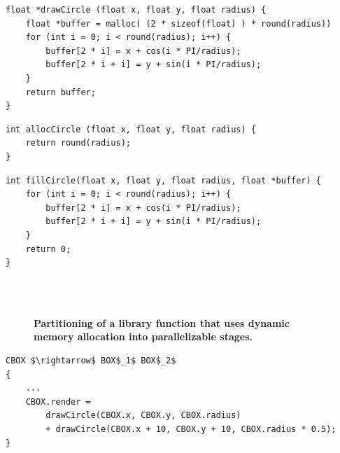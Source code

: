 \newsavebox{\stagedAllocFull}
\begin{lrbox}{\stagedAllocFull}%
\begin{lstlisting}[mathescape]
float *drawCircle (float x, float y, float radius) {
	float *buffer = malloc( (2 * sizeof(float) ) * round(radius))
	for (int i = 0; i < round(radius); i++) {
		buffer[2 * i] = x + cos(i * PI/radius);
		buffer[2 * i + i] = y + sin(i * PI/radius);
	}
	return buffer;
}
\end{lstlisting}
\end{lrbox}

\newsavebox{\stagedAllocAlloc}
\begin{lrbox}{\stagedAllocAlloc}%
\begin{lstlisting}[mathescape]
int allocCircle (float x, float y, float radius) {
	return round(radius);
}
\end{lstlisting}
\end{lrbox}


\newsavebox{\stagedAllocRender}
\begin{lrbox}{\stagedAllocRender}%
\begin{lstlisting}[mathescape]
int fillCircle(float x, float y, float radius, float *buffer) {
	for (int i = 0; i < round(radius); i++) {
		buffer[2 * i] = x + cos(i * PI/radius);
		buffer[2 * i + i] = y + sin(i * PI/radius);
	}	
	return 0;
}
\end{lstlisting}
\end{lrbox}


\begin{figure}
  \\
 \\
\caption{\textbf{Partitioning of a library function that uses dynamic memory allocation into parallelizable stages.}}
\label{fig:stagedalloc}
\end{figure}


\newsavebox{\twocirclesOrig}
\begin{lrbox}{\twocirclesOrig}%
\begin{lstlisting}[mathescape]
CBOX $\rightarrow$ BOX$_1$ BOX$_2$
{
	...
	CBOX.render = 
		drawCircle(CBOX.x, CBOX.y, CBOX.radius)
		+ drawCircle(CBOX.x + 10, CBOX.y + 10, CBOX.radius * 0.5);
}
\end{lstlisting}
\end{lrbox}

